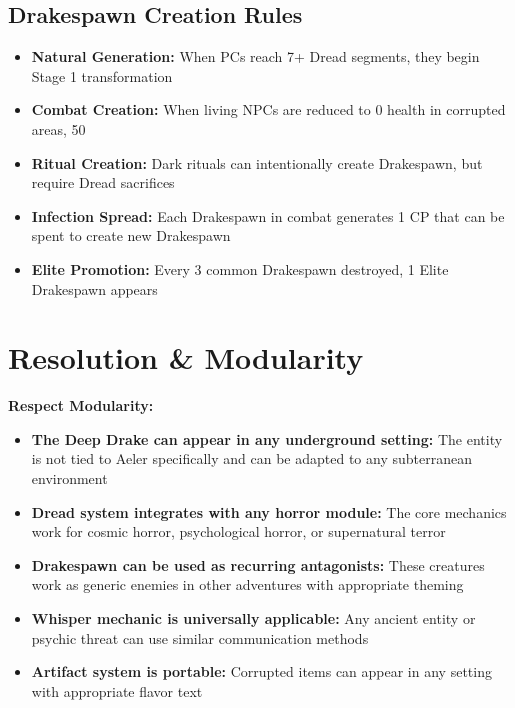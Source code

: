 \documentclass[11pt]{article}
\begin{document}
\subsection{Drakespawn Creation Rules}
\begin{itemize}
\item \textbf{Natural Generation:} When PCs reach 7+ Dread segments, they begin Stage 1 transformation
\item \textbf{Combat Creation:} When living NPCs are reduced to 0 health in corrupted areas, 50%
\item \textbf{Ritual Creation:} Dark rituals can intentionally create Drakespawn, but require Dread sacrifices
\item \textbf{Infection Spread:} Each Drakespawn in combat generates 1 CP that can be spent to create new Drakespawn
\item \textbf{Elite Promotion:} Every 3 common Drakespawn destroyed, 1 Elite Drakespawn appears
\end{itemize}

\section{Resolution \& Modularity}

\textbf{Respect Modularity:}
\begin{itemize}
\item \textbf{The Deep Drake can appear in any underground setting:} The entity is not tied to Aeler specifically and can be adapted to any subterranean environment
\item \textbf{Dread system integrates with any horror module:} The core mechanics work for cosmic horror, psychological horror, or supernatural terror
\item \textbf{Drakespawn can be used as recurring antagonists:} These creatures work as generic enemies in other adventures with appropriate theming
\item \textbf{Whisper mechanic is universally applicable:} Any ancient entity or psychic threat can use similar communication methods
\item \textbf{Artifact system is portable:} Corrupted items can appear in any setting with appropriate flavor text
\end{itemize}
\end{document}
